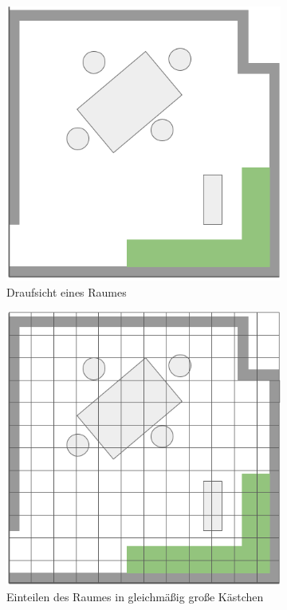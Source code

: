 \begin{figure}
  \begin{subfigure}[t]{.3\textwidth}
    \centering
    \includegraphics[width=.8\linewidth]{pic/vorwissen/2a_karte.png}
    \caption{Draufsicht eines Raumes}
  \end{subfigure}\hfill
  \begin{subfigure}[t]{.3\textwidth}
    \centering
    \includegraphics[width=.8\linewidth]{pic/vorwissen/2b_kartengitter.png}
    \caption{Einteilen des Raumes in gleichmäßig große Kästchen}
  \end{subfigure}\hfill
  \begin{subfigure}[t]{.3\textwidth}

\end{subfigure}
\end{figure}
